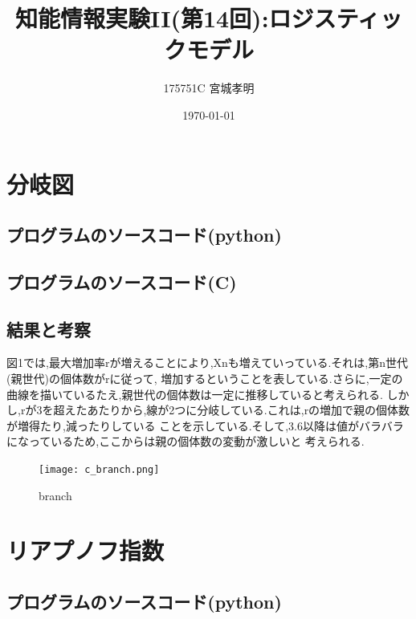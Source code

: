 \documentclass[a4paper,11pt,titlepage]{jarticle}
\title{知能情報実験II(第14回):ロジスティックモデル}
\author{175751C 宮城孝明}
\date{\today}
\begin{document}
\maketitle
\tableofcontents
\clearpage

\section{分岐図}
\subsection{プログラムのソースコード(python)}

\subsection{プログラムのソースコード(C)}

\subsection{結果と考察}
図1では,最大増加率rが増えることにより,Xnも増えていっている.それは,第n世代(親世代)の個体数がrに従って,
増加するということを表している.さらに,一定の曲線を描いているたえ,親世代の個体数は一定に推移していると考えられる.
しかし,rが3を超えたあたりから,線が2つに分岐している.これは,rの増加で親の個体数が増得たり,減ったりしている
ことを示している.そして,3.6以降は値がバラバラになっているため,ここからは親の個体数の変動が激しいと
考えられる.
\begin{figure}[htbp]
  \centering
  \texttt{[image: c\_branch.png]}
  \label{branch}\\
  \caption{branch}
\end{figure}



\section{リアプノフ指数}
\subsection{プログラムのソースコード(python)}

\end{document}
